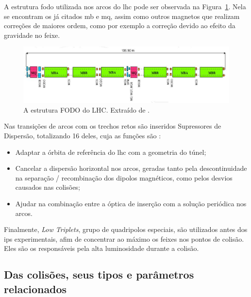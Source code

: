 A estrutura \gls{fodo} utilizada nos arcos do \gls{lhc} pode ser observada na
Figura~\ref{fig:fodo_lhc}. Nela se encontram os já citados \gls{mb} e
\gls{mq}, assim como outros magnetos que realizam correções de maiores ordem,
como por exemplo a correção devido ao efeito da gravidade no feixe. 

\begin{figure}[h!t]
\centering
\includegraphics[width=\textwidth]{imagens/fodo_lhc.jpg}
\caption[A estrutura FODO do LHC.]{A estrutura FODO do LHC. Extraído de \cite{closerLook}.}
\label{fig:fodo_lhc}
\end{figure}

Nas transições de arcos com os trechos retos são inseridos 
Supressores de Dispersão, totalizando 16 deles, cuja as funções são
\cite{lhc_design}:

\begin{itemize}
\item Adaptar a órbita de referência do \gls{lhc} com a geometria do túnel;
\item Cancelar a dispersão horizontal nos arcos, geradas tanto pela descontinuidade na
separação / recombinação dos dipolos magnéticos, como pelos desvios causados nas
colisões;
\item Ajudar na combinação entre a óptica de inserção com a solução periódica nos arcos.
\end{itemize}

Finalmente, \emph{Low Triplets}, grupo de quadripolos especiais, são utilizados antes dos
\glspl{ip} experimentais, afim de concentrar ao máximo os feixes nos pontos de
colisão. Eles são os responsáveis pela alta luminosidade durante a colisão.


\subsection{Das colisões, seus tipos e parâmetros relacionados}
\label{ssec:lhc_col}

